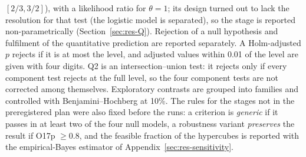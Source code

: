 $[2/3,3/2]$), with a likelihood ratio for $\theta=1$; its design turned out to lack the resolution for that test
(the logistic model is separated), so the stage is reported non-parametrically (Section~\ref{sec:res-Q}). Rejection
of a null hypothesis and fulfilment of the quantitative prediction are
reported separately. A Holm-adjusted $p$ rejects if it is at most the level, and adjusted values within 0.01 of
the level are given with four digits. Q2 is an intersection--union test: it rejects only if every component test
rejects at the full level, so the four component tests are not corrected among themselves. Exploratory contrasts
are grouped into families and controlled with Benjamini--Hochberg at 10\%. The rules for the stages not in the preregistered plan were also fixed before the runs: a criterion is \emph{generic} if it passes in at least two of the four null models, a
robustness variant \emph{preserves} the result if O17p $\ge0.8$, and the feasible fraction of the hypercubes is
reported with the empirical-Bayes estimator of Appendix~\ref{sec:res-sensitivity}.

